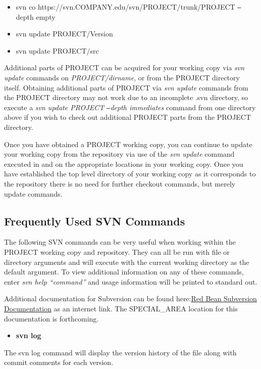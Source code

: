 \documentclass[12pt,letterpaper]{article}
\begin{document}
\begin{itemize}
\item svn co https://svn.COMPANY.edu/svn/PROJECT/trunk/PROJECT \texttt{--}depth empty
\item svn update PROJECT/Version
\item svn update PROJECT/src
\end{itemize}

Additional parts of PROJECT can be acquired for your working copy via \emph{svn update} commands on \emph{PROJECT/dirname}, or from the PROJECT directory itself.  Obtaining additional parts of PROJECT via \emph{svn update} commands from the PROJECT directory may not work due to an incomplete .svn directory, so execute a \emph{svn update PROJECT \texttt{--}depth immediates} command from one directory above if you wish to check out additional PROJECT parts from the PROJECT directory.

Once you have obtained a PROJECT working copy, you can continue to update your working copy from the repository via use of the \emph{svn update} command executed in and on the appropriate locations in your working copy.  Once you have established the top level directory of your working copy as it corresponds to the repository there is no need for further checkout commands, but merely update commands.

\subsection{Frequently Used SVN Commands}

The following SVN commands can be very useful when working within the PROJECT working copy and repository.  They can all be run with file or directory arguments and will execute with the current working directory as the default argument.  To view additional information on any of these commands, enter \emph{svn help ``command''} and usage information will be printed to standard out.

Additional documentation for Subversion can be found here:\linebreak \href{http://svnbook.red-bean.com}{Red Bean Subversion Documentation} as an internet link.  The SPECIAL_AREA location for this documentation is forthcoming.

\begin{itemize}
\item \textbf{svn log}
\end{itemize}

The svn log command will display the version history of the file along with commit comments for each version.
\end{document}
